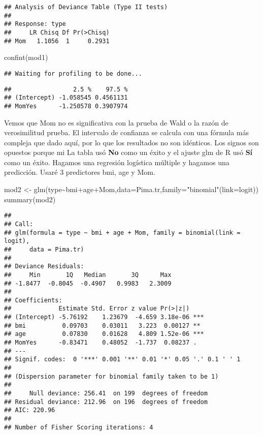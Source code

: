 \documentclass[
]{book}
\newenvironment{Shaded}{\begin{snugshade}}{\end{snugshade}}
\newcommand{\AttributeTok}[1]{\textcolor[rgb]{0.77,0.63,0.00}{#1}}
\newcommand{\FunctionTok}[1]{\textcolor[rgb]{0.00,0.00,0.00}{#1}}
\newcommand{\NormalTok}[1]{#1}
\newcommand{\OtherTok}[1]{\textcolor[rgb]{0.56,0.35,0.01}{#1}}
\newcommand{\SpecialCharTok}[1]{\textcolor[rgb]{0.00,0.00,0.00}{#1}}
\newcommand{\StringTok}[1]{\textcolor[rgb]{0.31,0.60,0.02}{#1}}
\begin{document}
\begin{verbatim}
## Analysis of Deviance Table (Type II tests)
## 
## Response: type
##     LR Chisq Df Pr(>Chisq)
## Mom   1.1056  1     0.2931
\end{verbatim}

\begin{Shaded}
\begin{Highlighting}[]
\FunctionTok{confint}\NormalTok{(mod1)}
\end{Highlighting}
\end{Shaded}

\begin{verbatim}
## Waiting for profiling to be done...
\end{verbatim}

\begin{verbatim}
##                 2.5 %    97.5 %
## (Intercept) -1.058545 0.4561131
## MomYes      -1.250578 0.3907974
\end{verbatim}

Vemos que Mom no es significativa con la prueba de Wald o la razón de verosimilitud
prueba. El intervalo de confianza se calcula con una fórmula más compleja que
dado aquí, por lo que los resultados no son idénticos. Los signos son opuestos porque mi
La tabla usó \textbf{No} como un éxito y el ajuste glm de R usó \textbf{Sí} como un éxito.
Hagamos una regresión logística múltiple y hagamos una predicción. Usaré 3 predictores
bmi, age y Mom.

\begin{Shaded}
\begin{Highlighting}[]
\NormalTok{mod2 }\OtherTok{\textless{}{-}} \FunctionTok{glm}\NormalTok{(type}\SpecialCharTok{\textasciitilde{}}\NormalTok{bmi}\SpecialCharTok{+}\NormalTok{age}\SpecialCharTok{+}\NormalTok{Mom,}\AttributeTok{data=}\NormalTok{Pima.tr,}\AttributeTok{family=}\StringTok{"binomial"}\NormalTok{(}\AttributeTok{link=}\NormalTok{logit))}
\FunctionTok{summary}\NormalTok{(mod2)}
\end{Highlighting}
\end{Shaded}

\begin{verbatim}
## 
## Call:
## glm(formula = type ~ bmi + age + Mom, family = binomial(link = logit), 
##     data = Pima.tr)
## 
## Deviance Residuals: 
##     Min       1Q   Median       3Q      Max  
## -1.8477  -0.8045  -0.4907   0.9983   2.3009  
## 
## Coefficients:
##             Estimate Std. Error z value Pr(>|z|)    
## (Intercept) -5.76192    1.23679  -4.659 3.18e-06 ***
## bmi          0.09703    0.03011   3.223  0.00127 ** 
## age          0.07830    0.01628   4.809 1.52e-06 ***
## MomYes      -0.83471    0.48052  -1.737  0.08237 .  
## ---
## Signif. codes:  0 '***' 0.001 '**' 0.01 '*' 0.05 '.' 0.1 ' ' 1
## 
## (Dispersion parameter for binomial family taken to be 1)
## 
##     Null deviance: 256.41  on 199  degrees of freedom
## Residual deviance: 212.96  on 196  degrees of freedom
## AIC: 220.96
## 
## Number of Fisher Scoring iterations: 4
\end{verbatim}
\end{document}
